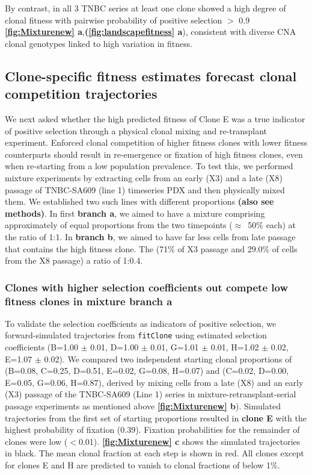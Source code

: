 By contrast, in all 3 TNBC series at least one clone showed a high degree of clonal fitness with pairwise probability of positive selection $>$ 0.9  \textbf{\autoref{fig:Mixturenew} a},\textbf{(\autoref{fig:landscapefitness} a}), consistent with diverse CNA clonal genotypes linked to high variation in fitness.

\subsection{Clone-specific fitness estimates forecast clonal competition trajectories} 
We next asked whether the high predicted fitness of Clone E was a true indicator of positive selection through a physical clonal mixing and re-transplant experiment. Enforced clonal competition of higher fitness clones with lower fitness counterparts should result in re-emergence or fixation of high fitness clones, even when re-starting from a low population prevalence. To test this, we performed mixture experiments by extracting cells from an early (X3) and a late (X8) passage of TNBC-SA609 (line 1) timeseries PDX and then physically mixed them. We established two such lines with different proportions \textbf{(also see methods)}.
In first \textbf{branch a}, we aimed to have a mixture comprising approximately of equal proportions from the two timepoints ($\approx$~50\% each) at the ratio of 1:1. In \textbf{branch b}, we aimed to have far less cells from late passage that contains the high fitness clone. The (71\% of X3 passage and 29.0\% of cells from the X8 passage) a ratio of 1:0.4.


\subsubsection{Clones with higher selection coefficients out compete low fitness clones in mixture branch a}
To validate the selection coefficients as indicators of positive selection, we forward-simulated trajectories from \texttt{fitClone} using estimated selection coefficients (B=1.00 $\pm$ 0.01, D=1.00 $\pm$ 0.01, G=1.01 $\pm$ 0.01, H=1.02 $\pm$ 0.02, E=1.07 $\pm$ 0.02). We compared two independent starting clonal proportions of (B=0.08, C=0.25, D=0.51, E=0.02, G=0.08, H=0.07) and (C=0.02, D=0.00, E=0.05, G=0.06, H=0.87), derived by mixing cells from a late (X8) and an early (X3) passage of the TNBC-SA609 (Line 1) series in mixture-retransplant-serial passage experiments as mentioned above \textbf{\autoref{fig:Mixturenew} b}). Simulated trajectories from the first set of starting proportions resulted in \textbf{clone E} with the highest probability of fixation (0.39). Fixation probabilities for the remainder of clones were low ($<$0.01). \textbf{\autoref{fig:Mixturenew} c} shows the simulated trajectories in black.
The mean clonal fraction at each step is shown in red. All clones except for clones E and H are predicted to vanish to clonal fractions of below 1\%. 


